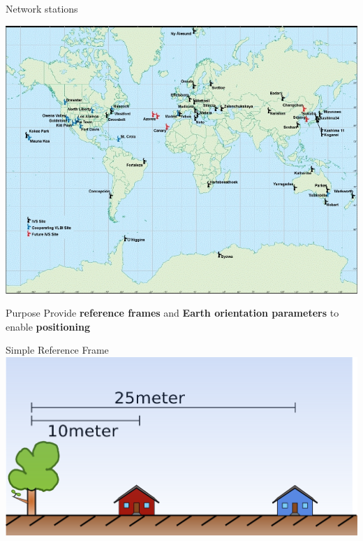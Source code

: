 \documentclass[14pt,table,t, c]{beamer}
\begin{document}
\begin{frame}{Network stations}
\begin{centering}
    \hfill\includegraphics[width=0.8\linewidth]{figure/ivsnetmap}\hspace*{\fill}
\end{centering}
\end{frame}

\begin{frame}[c]{Purpose}
\huge {Provide \textbf{reference frames} and \textbf{Earth orientation parameters} to enable \textbf{positioning}}
\end{frame}

\begin{frame}{Simple Reference Frame}
    \hfill\includegraphics[width=\linewidth]{figure/tre}\hspace*{\fill}
\end{frame}
\end{document}
